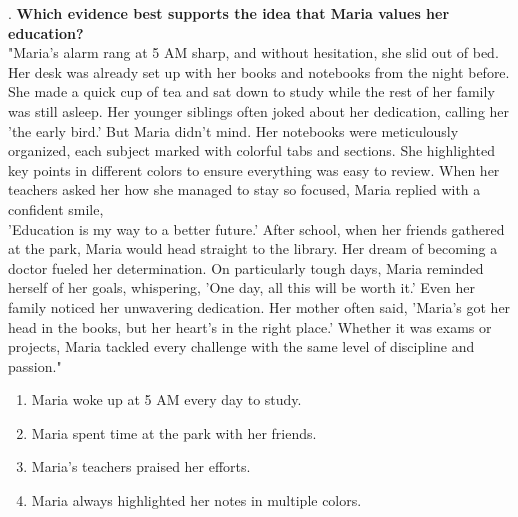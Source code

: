 \documentclass[12pt]{article}
\begin{document}
\vspace{1cm}
. \textbf{Which evidence best supports the idea that Maria values her education?}\\
"Maria’s alarm rang at 5 AM sharp, and without hesitation, she slid out of bed. Her desk was already set up with her books and notebooks from the night before. She made a quick cup of tea and sat down to study while the rest of her family was still asleep. Her younger siblings often joked about her dedication, calling her 'the early bird.' But Maria didn’t mind. Her notebooks were meticulously organized, each subject marked with colorful tabs and sections. She highlighted key points in different colors to ensure everything was easy to review. When her teachers asked her how she managed to stay so focused, Maria replied with a confident smile, \\'Education is my way to a better future.' After school, when her friends gathered at the park, Maria would head straight to the library. Her dream of becoming a doctor fueled her determination. On particularly tough days, Maria reminded herself of her goals, whispering, 'One day, all this will be worth it.' Even her family noticed her unwavering dedication. Her mother often said, 'Maria’s got her head in the books, but her heart’s in the right place.' Whether it was exams or projects, Maria tackled every challenge with the same level of discipline and passion."  
\begin{enumerate}[label=\Alph*.]
    \item Maria woke up at 5 AM every day to study.  
    \item Maria spent time at the park with her friends.  
    \item Maria’s teachers praised her efforts.  
    \item Maria always highlighted her notes in multiple colors.  
\end{enumerate}
\newpage
\vspace{1cm}
\end{document}
